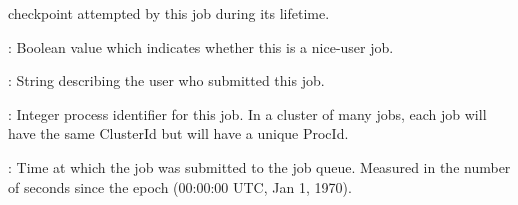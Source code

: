 \begin{description}
checkpoint attempted by this job during its lifetime.
%
\item[\AdAttr{NiceUser}] : Boolean value which indicates whether
this is a nice-user job.
%
\item[\AdAttr{Owner}] : String describing the user who submitted this
job.
%
\item[\AdAttr{ProcId}] : Integer process identifier for this job.  In
a cluster of many jobs, each job will have the same ClusterId but will
have a unique ProcId.
%
\item[\AdAttr{QDate}] : Time at which the job was submitted to the job
queue.  Measured in the
number of seconds since the epoch (00:00:00 UTC, Jan 1, 1970).
%
\end{description}
